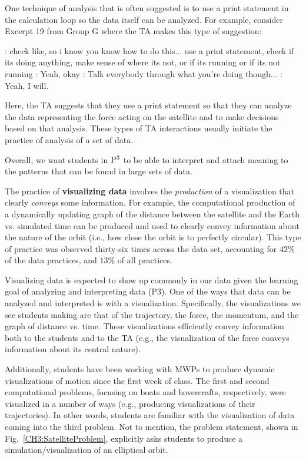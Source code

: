 \documentclass{msuphddissertation}
\begin{document}
\begin{doublespace}
One technique of analysis that is often suggested is to use a print statement in the calculation loop so the data itself can be analyzed.  For example, consider Excerpt 19 from Group G where the TA makes this type of suggestion: \begin{description}
\TA: check like, so i know you know how to do this... use a print statement, check if its doing anything, make sense of where its not, or if its running or if its not running
\SB: Yeah, okay
\TA: Talk everybody through what you're doing though...
\SB: Yeah, I will.\end{description}  Here, the TA suggests that they use a print statement so that they can analyze the data representing the force acting on the satellite and to make decisions based on that analysis.  These types of TA interactions usually initiate the practice of analysis of a set of data.

Overall, we want students in ${\rm P}^{3}$ to be able to interpret and attach meaning to the patterns that can be found in large sets of data.

The practice of \textbf{visualizing data} involves the \textit{production} of a visualization that clearly \textit{conveys} some information.  For example, the computational production of a dynamically updating graph of the distance between the satellite and the Earth vs. simulated time can be produced and used to clearly convey information about the nature of the orbit (i.e., how close the orbit is to perfectly circular).  This type of practice was observed thirty-six times across the data set, accounting for $42\%$ of the data practices, and $13\%$ of all practices.

Visualizing data is expected to show up commonly in our data given the learning goal of analyzing and interpreting data (P3).  One of the ways that data can be analyzed and interpreted is with a visualization.  Specifically, the visualizations we see students making are that of the trajectory, the force, the momentum, and the graph of distance vs. time.  These visualizations efficiently convey information both to the students and to the TA (e.g., the visualization of the force conveys information about its central nature).

Additionally, students have been working with MWPs to produce dynamic visualizations of motion since the first week of class.  The first and second computational problems, focusing on boats and hovercrafts, respectively, were visualized in a number of ways (e.g., producing visualizations of their trajectories).  In other words, students are familiar with the visualization of data coming into the third problem.  Not to mention, the problem statement, shown in Fig.~\ref{CH3:SatelliteProblem}, explicitly asks students to produce a simulation/visualization of an elliptical orbit. 


\end{doublespace}
\end{document}
